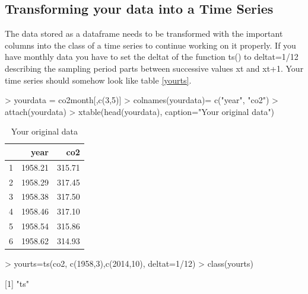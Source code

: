 \documentclass[11pt, a4paper]{article} %
\begin{document}
\subsection{Transforming your data into a Time Series}%
The data stored as a dataframe needs to be transformed with the important columns into the class of a time series to continue working on it properly. If you have monthly data you have to set the deltat of the function ts() to deltat=1/12 describing the sampling period parts between successive values xt and xt+1. Your time series should somehow look like table \ref{yourts}.\\
\begin{Schunk}
\begin{Sinput}
> yourdata = co2month[,c(3,5)]
> colnames(yourdata)= c("year", "co2")
> attach(yourdata)
> xtable(head(yourdata), caption="Your original data")
\end{Sinput}
\begin{table}[ht]
\centering
\begin{tabular}{rrr}
  \hline
 & year & co2 \\ 
  \hline
1 & 1958.21 & 315.71 \\ 
  2 & 1958.29 & 317.45 \\ 
  3 & 1958.38 & 317.50 \\ 
  4 & 1958.46 & 317.10 \\ 
  5 & 1958.54 & 315.86 \\ 
  6 & 1958.62 & 314.93 \\ 
   \hline
\end{tabular}
\caption{Your original data} 
\end{table}\begin{Sinput}
> yourts=ts(co2, c(1958,3),c(2014,10), deltat=1/12)
> class(yourts)
\end{Sinput}
[1] "ts"\end{Schunk}
\end{document}
